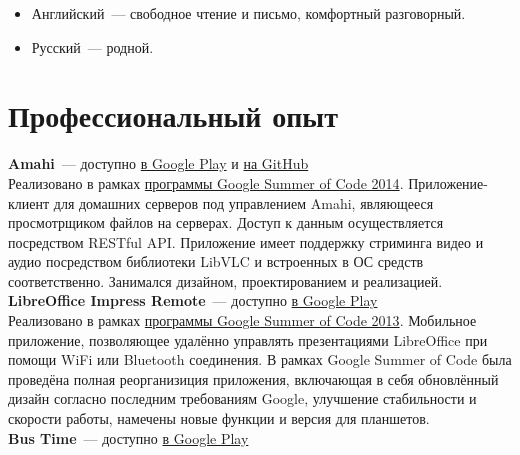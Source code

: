     \begin{itemize}

      \item Английский~--- свободное чтение и письмо, комфортный разговорный.

      \item Русский~--- родной.

    \end{itemize}


  \section*{Профессиональный опыт}

      \textbf{Amahi}~--- доступно \href{https://play.google.com/store/apps/details?id=org.amahi.anywhere}{в Google Play}
        и \href{https://github.com/amahi/android}{на GitHub} \\

        Реализовано в рамках \href{https://developers.google.com/open-source/soc}{программы Google Summer of Code 2014}.
        Приложение-клиент для домашних серверов под управлением Amahi, являющееся
        просмотрщиком файлов на серверах. Доступ к данным осуществляется
        посредством RESTful API. Приложение имеет поддержку стриминга
        видео и аудио посредством библиотеки LibVLC и встроенных в ОС
        средств соответственно. Занимался дизайном, проектированием и реализацией. \\

      \textbf{LibreOffice Impress Remote}~--- доступно \href{https://play.google.com/store/apps/details?id=org.libreoffice.impressremote}{в Google Play} \\

        Реализовано в рамках \href{https://developers.google.com/open-source/soc}{программы Google Summer of Code 2013}.
        Мобильное приложение, позволяющее удалённо управлять презентациями
        LibreOffice при помощи WiFi или Bluetooth соединения. В рамках
        Google Summer of Code была проведёна полная реорганизиция приложения,
        включающая в себя обновлённый дизайн согласно последним требованиям
        Google, улучшение стабильности и скорости работы, намечены новые
        функции и версия для планшетов. \\

      \textbf{Bus Time}~--- доступно \href{https://play.google.com/store/apps/details?id=ru.ming13.bustime}{в Google Play} \\


